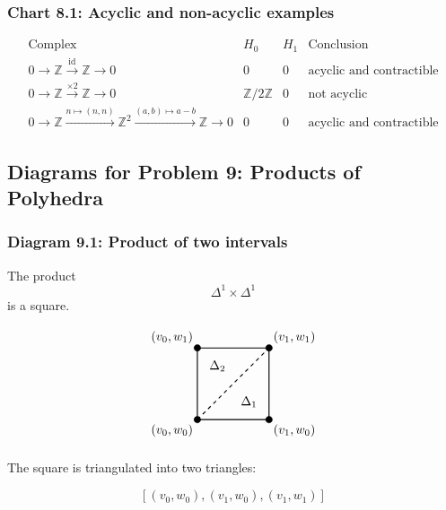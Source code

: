 \documentclass[12pt,a4paper]{article}
\theoremstyle{notespace}
\begin{document}
\subsubsection{Chart 8.1: Acyclic and non-acyclic examples}

\[
\begin{array}{c|c|c|c}
	\text{Complex} & H_0 & H_1 & \text{Conclusion} \\
	\hline
	0\to \mathbb Z\xrightarrow{\operatorname{id}}\mathbb Z\to 0
	& 0 & 0 & \text{acyclic and contractible} \\
	\hline
	0\to \mathbb Z\xrightarrow{\times 2}\mathbb Z\to 0
	& \mathbb Z/2\mathbb Z & 0 & \text{not acyclic} \\
	\hline
	0\to \mathbb Z\xrightarrow{n\mapsto(n,n)}\mathbb Z^2
	\xrightarrow{(a,b)\mapsto a-b}\mathbb Z\to 0
	& 0 & 0 & \text{acyclic and contractible}
\end{array}
\]

\subsection{Diagrams for Problem 9: Products of Polyhedra}

\subsubsection{Diagram 9.1: Product of two intervals}

The product
\[
\Delta^1\times\Delta^1
\]
is a square.

\[
\begin{tikzpicture}[scale=2]
	\coordinate (A) at (0,0);
	\coordinate (B) at (1,0);
	\coordinate (C) at (0,1);
	\coordinate (D) at (1,1);
	
	\draw[thick] (A) -- (B) -- (D) -- (C) -- cycle;
	\draw[thick,dashed] (A) -- (D);
	
	\filldraw (A) circle (1.3pt);
	\filldraw (B) circle (1.3pt);
	\filldraw (C) circle (1.3pt);
	\filldraw (D) circle (1.3pt);
	
	\node[below left] at (A) {$(v_0,w_0)$};
	\node[below right] at (B) {$(v_1,w_0)$};
	\node[above left] at (C) {$(v_0,w_1)$};
	\node[above right] at (D) {$(v_1,w_1)$};
	
	\node at (0.72,0.25) {$\Delta_1$};
	\node at (0.28,0.75) {$\Delta_2$};
\end{tikzpicture}
\]

The square is triangulated into two triangles:

\[
[(v_0,w_0),(v_1,w_0),(v_1,w_1)]
\]
\end{document}
